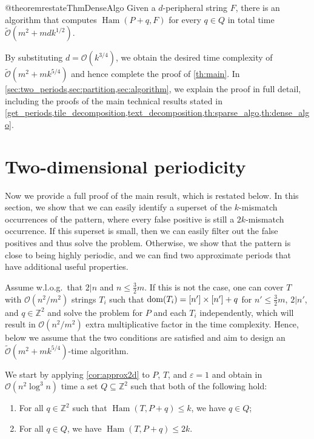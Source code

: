 \documentclass[a4paper,11pt]{article}
\newcommand{\Z}{\mathbb{Z}}
\renewcommand{\O}{\mathcal{O}}
\newcommand{\tO}{\tilde{\mathcal{O}}}
\DeclareMathOperator*{\Ham}{Ham}
\begin{document}
\begin{restatable*}{@theorem}{restateThmDenseAlgo}
\label{th:dense_algo}
Given a $d$-peripheral string $F$, there is an algorithm that computes $\Ham(P + q, F)$ for every $q \in Q$ in total time $\tO(m^2 + mdk^{1/2})$.
\end{restatable*}

By substituting $d = \O(k^{3/4})$, we obtain the desired time complexity of $\tO(m^2 + mk^{5/4})$ and hence complete the proof of \cref{th:main}.
In \cref{sec:two_periods,sec:partition,sec:algorithm}, we explain the proof in full detail, including the proofs of the main technical results stated in \cref{get_periods,tile_decomposition,text_decomposition,th:sparse_algo,th:dense_algo}.


\section{Two-dimensional periodicity}
\label{sec:two_periods}


Now we provide a full proof of the main result, which is restated below. In this section, we show that we can easily identify a superset of the $k$-mismatch occurrences of the pattern, where every false positive is still a $2k$-mismatch occurrence. If this superset is small, then we can easily filter out the false positives and thus solve the problem. Otherwise, we show that the pattern is close to being highly periodic, and we can find two approximate periods that have additional useful properties.

\restateThmMain*

Assume w.l.o.g.~that $2|n$ and $n \le \frac{3}{2}m$. If this is not the case, one can cover $T$ with $\O(n^2/m^2)$ strings $T_i$ such that $\operatorname*{dom}(T_i) = [n'] \times [n'] + q$ for $n' \le \frac{3}{2}m$, $2|n'$, and $q \in \Z^2$ and solve the problem for $P$ and each $T_i$ independently, which will result in $\O(n^2/m^2)$ extra multiplicative factor in the time complexity. Hence, below we assume that the two conditions are satisfied and aim to design an $\tO(m^2 + mk^{5/4})$-time algorithm. 

We start by applying \cref{cor:approx2d} to $P$, $T$, and $\varepsilon = 1$ and obtain in $\O(n^2 \log^3 n)$ time a set $Q \subseteq \Z^2$ such that both of the following hold:
\begin{enumerate}
\item For all $q \in \Z^2$ such that $\Ham(T, P+q) \le k$, we have $q \in Q$;
\item For all $q \in Q$, we have $\Ham(T, P+q) \le 2 k$.
\end{enumerate}
\end{document}
